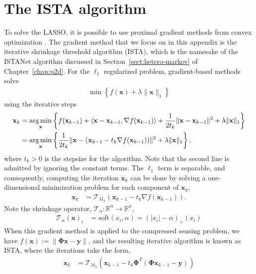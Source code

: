 \section{The ISTA algorithm}
To solve the LASSO, it is possible to use proximal gradient methods from convex optimization \cite{ref:beck2009fast}. The gradient method that we focus on in this appendix is the iterative shrinkage threshold algorithm (ISTA), which is the namesake of the ISTANet algorithm discussed in Section~\ref{sect:hetero-markov} of Chapter~\ref{chap:p2d}. For the $\ell_1$ regularized problem, gradient-based methods solve 
\begin{align*}
    \min \left\{f(\mathbf{x})+\lambda\|\mathbf{x}\|_1\right\}
\end{align*}
using the iterative steps
\begin{align*}
    \mathbf{x}_k &= \operatorname*{arg\,min}_{\mathbf{x}} \left\{f(\mathbf{x}_{k-1}) + \langle \mathbf{x} - \mathbf{x}_{k-1}, \nabla f(\mathbf{x}_{k-1}) \rangle + \frac{1}{2t_k}\|\mathbf{x} - \mathbf{x}_{k-1}\|^2 + \lambda\|\mathbf{x}\|_1\right\} \\
    &= \operatorname*{arg\,min}_{\mathbf{x}} \left\{\frac{1}{2t_k}\|\mathbf{x} - (\mathbf{x}_{k-1} - t_k\nabla f(\mathbf{x}_{k-1}))\|^2 + \lambda\|\mathbf{x}\|_1\right\},
\end{align*}
where $t_k>0$ is the stepsize for the algorithm. Note that the second line is admitted by ignoring the constant terms. The $\ell_1$ term is separable, and consequently, computing the iteration $\mathbf{x}_k$ can be done by solving a one-dimensional minimization problem for each component of $\mathbf{x}_k$,
\begin{align*}
    \mathbf{x}_k &= \mathcal{T}_{\lambda t_k} (\mathbf{x}_{k-1} - t_k\nabla f(\mathbf{x}_{k-1})).
\end{align*}
Note the shrinkage operator, $\mathcal{T}_{\alpha} : \mathbb{R}^n \to \mathbb{R}^n$,
\begin{align*}
    \mathcal{T}_{\alpha}(\mathbf{x})_i &= \text{soft}(x_i, \alpha) = (|x_i| - \alpha)_{+}(x_i)
\end{align*}
When this gradient method is applied to the compressed sensing problem, we have $f(\mathbf{x}) := \|\mathbf{\Phi}\mathbf{x}-\mathbf{y}\|$, and the resulting iterative algorithm is known as ISTA, where the iterations take the form,
\begin{align}
    \mathbf{x}_k &= \mathcal{T}_{\lambda t_k}(\mathbf{x}_{k-1} - t_k\mathbf{\Phi}^T(\mathbf{\Phi} \mathbf{x}_{k-1} - \mathbf{y}))
\end{align}
